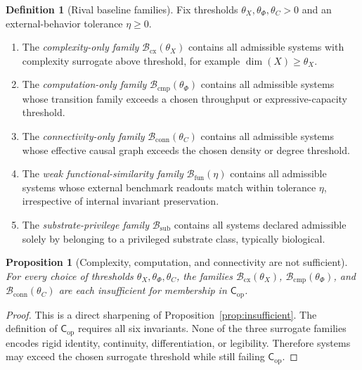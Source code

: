 \documentclass[11pt,a4paper]{article}
\newtheorem{proposition}[theorem]{Proposition}
\theoremstyle{definition}
\newtheorem{definition}[theorem]{Definition}
\newcommand{\Cop}{\mathsf{C}_{\mathrm{op}}}
\begin{document}
\begin{definition}[Rival baseline families]\label{def:baseline}
Fix thresholds $\theta_X,\theta_\Phi,\theta_C >0$ and an external-behavior tolerance $\eta \ge 0$.
\begin{enumerate}[leftmargin=1.5em]
\item The \emph{complexity-only family} $\mathcal{B}_{\mathrm{cx}}(\theta_X)$ contains all admissible systems with complexity surrogate above threshold, for example $\dim(X) \ge \theta_X$.
\item The \emph{computation-only family} $\mathcal{B}_{\mathrm{cmp}}(\theta_\Phi)$ contains all admissible systems whose transition family exceeds a chosen throughput or expressive-capacity threshold.
\item The \emph{connectivity-only family} $\mathcal{B}_{\mathrm{conn}}(\theta_C)$ contains all admissible systems whose effective causal graph exceeds the chosen density or degree threshold.
\item The \emph{weak functional-similarity family} $\mathcal{B}_{\mathrm{fun}}(\eta)$ contains all admissible systems whose external benchmark readouts match within tolerance $\eta$, irrespective of internal invariant preservation.
\item The \emph{substrate-privilege family} $\mathcal{B}_{\mathrm{sub}}$ contains all systems declared admissible solely by belonging to a privileged substrate class, typically biological.
\end{enumerate}
\end{definition}

\begin{proposition}[Complexity, computation, and connectivity are not sufficient]\label{prop:baseline-insufficient}
For every choice of thresholds $\theta_X,\theta_\Phi,\theta_C$, the families $\mathcal{B}_{\mathrm{cx}}(\theta_X)$, $\mathcal{B}_{\mathrm{cmp}}(\theta_\Phi)$, and $\mathcal{B}_{\mathrm{conn}}(\theta_C)$ are each insufficient for membership in $\Cop$.
\end{proposition}

\begin{proof}
This is a direct sharpening of Proposition~\ref{prop:insufficient}. The definition of $\Cop$ requires all six invariants. None of the three surrogate families encodes rigid identity, continuity, differentiation, or legibility. Therefore systems may exceed the chosen surrogate threshold while still failing $\Cop$.
\end{proof}
\end{document}
